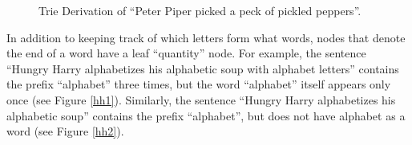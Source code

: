 \begin{figure}[H]
  \begin{center}
  \caption{Trie Derivation of ``Peter Piper picked a peck of pickled peppers''.}
  \label{triepeterpiper}
  \end{center}
\end{figure}

In addition to keeping track of which letters form what words, nodes that denote the end of a word have a leaf ``quantity'' node. For example, the sentence ``Hungry Harry alphabetizes his alphabetic soup with alphabet letters'' contains the prefix ``alphabet'' three times, but the word ``alphabet'' itself appears only once (see Figure \ref{hh1}). Similarly, the sentence ``Hungry Harry alphabetizes his alphabetic soup'' contains the prefix ``alphabet'', but does not have alphabet as a word (see Figure \ref{hh2}). 

